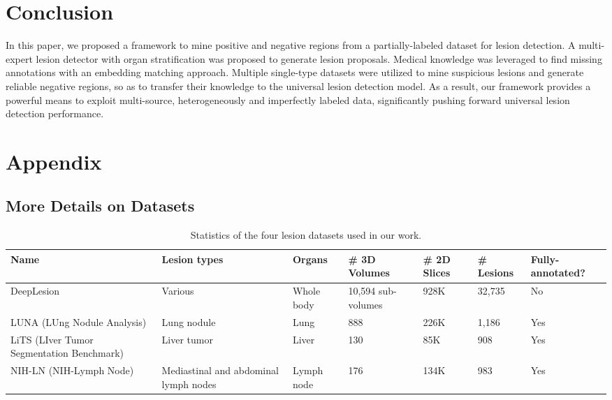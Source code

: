 \documentclass[runningheads]{llncs}
\begin{document}
\section{Conclusion}
\label{sec:conclusion}

In this paper, we proposed a framework to mine positive and negative regions from a partially-labeled dataset for lesion detection. A multi-expert lesion detector with organ stratification was proposed to generate lesion proposals. Medical knowledge was leveraged to find missing annotations with an embedding matching approach. Multiple single-type datasets were utilized to mine suspicious lesions and generate reliable negative regions, so as to transfer their knowledge to the universal lesion detection model. As a result, our framework provides a powerful means to exploit multi-source, heterogeneously and imperfectly labeled data, significantly pushing forward universal lesion detection performance.

\section{Appendix}
\subsection{More Details on Datasets}
\label{subsec:dataset}

\begin{table}[]
	\begin{center}
		\scriptsize
		\setlength{\tabcolsep}{4pt}
		\renewcommand{\arraystretch}{1.5}
		\caption{Statistics of the four lesion datasets used in our work.}
		\label{tbl:datasets}
		\begin{tabular}{p{2.5cm}p{2cm}p{1cm}p{1.2cm}p{.9cm}p{1cm}p{1cm}}
\hline\hline
			Name	& Lesion types	& Organs	& \# 3D Volumes	& \# 2D Slices	& \# Lesions	& Fully-annotated?	 \\
\hline\hline
			DeepLesion~\cite{Yan2018DeepLesion}	& Various	& Whole body	& 10,594 sub-volumes	& 928K	& 32,735	& No \\
			\hline
			LUNA (LUng Nodule Analysis)~\cite{Setio2017LUNA}	& Lung nodule	& Lung	& 888	& 226K	& 1,186	& Yes \\
			\hline
			LiTS (LIver Tumor Segmentation Benchmark)~\cite{Bilic2019LiTS}	& Liver tumor	& Liver	& 130	& 85K	& 908	& Yes \\
			\hline
			NIH-LN (NIH-Lymph Node)~\cite{NIH_LN_dataset}	& Mediastinal and abdominal lymph nodes	& Lymph node	& 176	& 134K	& 983	& Yes \\			\hline\hline
\end{tabular}
	\end{center}
\end{table}
\end{document}
